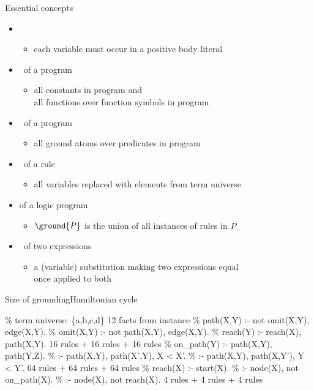\begin{frame}{Essential concepts}
  \begin{itemize}
    \item {}
      \begin{itemize}\normalsize
        \item each variable must occur in a positive body literal
      \end{itemize}
    \item {} \ of a program
      \begin{itemize}
        \item
          all constants in program and\\
          all functions over function symbols in program
      \end{itemize}
    \item {} \ of a program
      \begin{itemize}
        \item all ground atoms over predicates in program
      \end{itemize}
    \item {} \ of a rule
      \begin{itemize}
        \item all variables replaced with elements from term universe
      \end{itemize}
    \item {} of a logic program
      \begin{itemize}\normalsize
        \item \(\ground{P}\) is the union of all instances of %
              rules in \(P\)
      \end{itemize}
    \item {} \ of two expressions
      \begin{itemize}
      \item a (variable) substitution making two expressions equal\\ once applied to both
      \end{itemize}
  \end{itemize}
\end{frame}
\begin{frame}{Size of grounding}{Hamiltonian cycle}
  \begin{SemiVerbatim}{.9}
{\color{comment}\% term universe: \{a,b,c,d\}}
12 facts from instance
{\color{comment}\% path(X,Y) :- not omit(X,Y), edge(X,Y).}
{\color{comment}\% omit(X,Y) :- not path(X,Y), edge(X,Y).}
{\color{comment}\% reach(Y) :- reach(X), path(X,Y).}
16 rules + 16 rules + 16 rules
{\color{comment}\% on_path(Y) :- path(X,Y), path(Y,Z).}
{\color{comment}\% :- path(X,Y), path(X',Y), X < X'.}
{\color{comment}\% :- path(X,Y), path(X,Y'), Y < Y'.}
64 rules + 64 rules + 64 rules
{\color{comment}\% reach(X) :- start(X).}
{\color{comment}\% :- node(X), not on_path(X).}
{\color{comment}\% :- node(X), not reach(X).}
4 rules + 4 rules + 4 rules
  \end{SemiVerbatim}
\end{frame}
